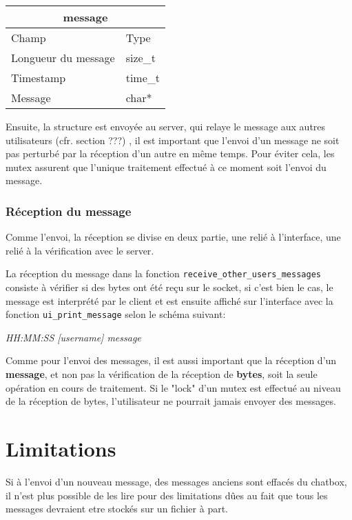 \documentclass[11pt]{article}
\begin{document}
                \begin{center}        

                    \begin{tabular}{ |p{4cm}|p{1cm}| }
                        \hline
                        \multicolumn{2}{|c|}{\textbf{message}} \\
                        
                        \hline
                        Champ & Type\\
                        
                        \hline
                        Longueur du message & size\_t\\
                        Timestamp & time\_t\\
                        Message & char*\\
                        \hline

                    \end{tabular}
                \end{center}
                
                Ensuite, la structure est envoyée au server, qui relaye le message
                aux autres utilisateurs (cfr. section ???) , il est important que
                l'envoi d'un message ne soit pas perturbé par la réception d'un autre en même temps.
                Pour éviter cela, les mutex assurent que l'unique traitement effectué à ce moment soit
                l'envoi du message.

            \subsubsection{Réception du message}
                Comme l'envoi, la réception se divise en deux partie, une relié à 
                l'interface, une relié à la vérification avec le server.
            
                La réception du message dans la fonction \texttt{receive\_other\_users\_messages}
                consiste à vérifier si des bytes ont été reçu sur le socket,
                 si c'est bien le cas, le message est interprété par le client et est ensuite 
                affiché sur l'interface avec la fonction \texttt{ui\_print\_message} selon le schéma suivant: \\
                \begin{center}
                    \textit{HH:MM:SS [username] message} 
                \end{center}
                Comme pour l'envoi des messages, il est aussi important que
                la réception d'un \textbf{message}, et non pas la vérification de la réception de \textbf{bytes},
                soit la seule opération en cours de traitement. Si le "lock" d'un mutex
                est effectué au niveau de la réception de bytes, l'utilisateur ne pourrait jamais
                envoyer des messages.
                
        \section{Limitations}
            Si à l'envoi d'un nouveau message, des messages anciens sont effacés du chatbox,
            il n'est plus possible de les lire pour des limitations dûes au fait que tous les messages
            devraient etre stockés sur un fichier à part.
\end{document}
